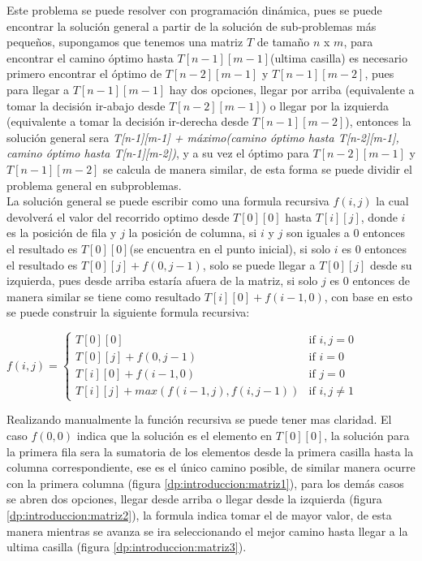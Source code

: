 \documentclass[12pt, a4paper]{article}
\begin{document}
	Este problema se puede resolver con programación dinámica, pues se puede encontrar la solución general a partir de 
	la solución de sub-problemas más pequeños, supongamos que tenemos una matriz $T$ de tamaño $n$ x $m$, para  
	encontrar el camino óptimo hasta $T[n-1][m-1]$(ultima casilla) es necesario primero 
	encontrar el óptimo de $T[n-2][m-1]$ y $T[n-1][m-2]$, pues para llegar a $T[n-1][m-1]$ hay dos opciones, llegar 
	por arriba (equivalente a tomar la decisión ir-abajo desde $T[n-2][m-1]$) o llegar por la izquierda (equivalente 
	a tomar la decisión ir-derecha desde $T[n-1][m-2]$), entonces la solución general sera \textit{T[n-1][m-1] + 
	máximo(camino óptimo hasta T[n-2][m-1], camino óptimo hasta T[n-1][m-2])}, y a su vez el óptimo para $T[n-2][m-1]$ 
	y $T[n-1][m-2]$ se calcula de manera similar, de esta forma se puede dividir el problema general en subproblemas.\\
	
	La solución general se puede escribir como una formula recursiva $f(i,j)$ la cual devolverá el valor del recorrido 
	optimo desde $T[0][0]$ hasta $T[i][j]$, donde $i$ es la posición de fila y $j$ la posición de columna, si $i$ y 
	$j$ son iguales a $0$ entonces el resultado es $T[0][0]$(se encuentra en el punto inicial), si solo $i$ es $0$ 
	entonces el resultado es $T[0][j] + f(0,j-1)$, solo se puede llegar a $T[0][j]$ desde su izquierda, pues desde 
	arriba estaría afuera de la matriz, si solo $j$ es $0$ entonces de manera similar se tiene como resultado 
	$T[i][0] + f(i-1,0)$, con base en esto se puede construir la siguiente formula recursiva:
	\begin{center}
		$f(i, j) = 	
		\begin{cases}
			T[0][0] & \text{if $i,j = 0$}\\
			T[0][j] + f(0, j-1) & \text{if $i = 0$}\\
			T[i][0] + f(i-1, 0) & \text{if $j = 0$}\\
			T[i][j] + max(f(i-1, j), f(i, j-1)) & \text{if $i,j \neq 1$}
		\end{cases}
	$\\
	\end{center}
	Realizando manualmente la función recursiva se puede tener mas claridad. El caso $f(0,0)$ indica que la solución
	es el elemento en $T[0][0]$, la solución para la primera fila sera la sumatoria de los elementos desde 
	la primera casilla hasta la columna correspondiente, ese es el único camino posible, de similar manera ocurre
	con la primera columna (figura \ref{dp:introduccion:matriz1}), para los demás casos se abren dos opciones, llegar  
	desde arriba o llegar desde la izquierda (figura \ref{dp:introduccion:matriz2}), la formula indica tomar el de 
	mayor valor, de esta manera mientras se avanza se ira seleccionando el mejor camino hasta llegar a la ultima 
	casilla (figura \ref{dp:introduccion:matriz3}).\\
	
\end{document}

